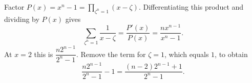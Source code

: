 Factor $P(x)=x^n-1=\prod_{\zeta^n=1}(x-\zeta)$. Differentiating this product and dividing by $P(x)$ gives
\[
\sum_{\zeta^n=1}\dfrac{1}{x-\zeta}=\dfrac{P'(x)}{P(x)}
=\dfrac{nx^{n-1}}{x^n-1}.
\]
At $x=2$ this is $\dfrac{n2^{n-1}}{2^n-1}$. Remove the term for $\zeta=1$, which equals $1$, to obtain
\[
\dfrac{n2^{n-1}}{2^n-1}-1
=\boxed{\dfrac{(n-2)2^{n-1}+1}{2^n-1}}.
\]

